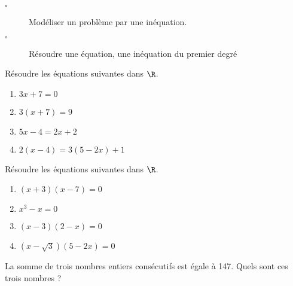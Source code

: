 \begin{titre}

\end{titre}

\begin{CpsCol}
\begin{description}
\item[$\square$] Modéliser un problème par une inéquation.
\item[$\square$] Résoudre une équation, une inéquation du premier degré
\end{description}
\end{CpsCol}



\begin{minipage}{0.48\linewidth}


Résoudre les équations suivantes dans $\R$.

\begin{enumerate}
\item $3x+7=0$
\item $3(x+7)=9$
\item $5x-4=2x+2$
\item $2(x-4)=3(5-2x)+1$
\end{enumerate}

\end{minipage}
\hfill
\begin{minipage}{0.48\linewidth}


Résoudre les équations suivantes dans $\R$.

\begin{enumerate}
\item $(x+3)(x-7)=0$
\item $x^3-x=0$
\item $(x-3)(2-x)=0$
\item $\left( x-\sqrt{3} \right)(5-2x)=0$
\end{enumerate}
\end{minipage}


La somme de trois nombres entiers consécutifs est égale à 147. Quels sont ces trois nombres ?



